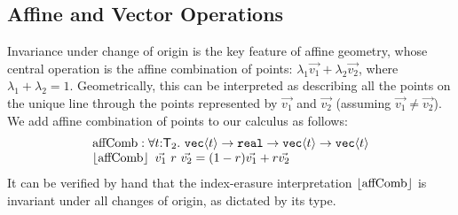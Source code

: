 \subsection{Affine and Vector Operations}
\label{sec:affine-vector-ops}

Invariance under change of origin is the key feature of affine
geometry, whose central operation is the affine combination of points:
$\lambda_1\vec{v_1} + \lambda_2\vec{v_2}$, where $\lambda_1 +
\lambda_2 = 1$.  Geometrically, this can be interpreted as describing
all the points on the unique line through the points represented by
$\vec{v_1}$ and $\vec{v_2}$ (assuming $\vec{v_1} \not= \vec{v_2}$).
We add affine combination of points to our calculus as
follows: %
\begin{displaymath}
  \begin{array}{l}
    \mathrm{affComb} :\forall t \mathord:
    \mathsf{T}_2.\ \textup{\texttt{vec}}\langle t \rangle \to \textup{\texttt{real}} \to
    \textup{\texttt{vec}}\langle t \rangle \to \textup{\texttt{vec}}\langle t \rangle \\ 
    \left\lfloor{\mathrm{affComb}}\right\rfloor\ \vec{v_1}\ r\ \vec{v_2} = (1-r)\vec{v_1} +
    r\vec{v_2} 
\end{array}
\end{displaymath}
It can be verified by hand that the index-erasure interpretation %
$\left\lfloor{\mathrm{affComb}}\right\rfloor$ is invariant under all changes of origin, as
dictated by its type.

